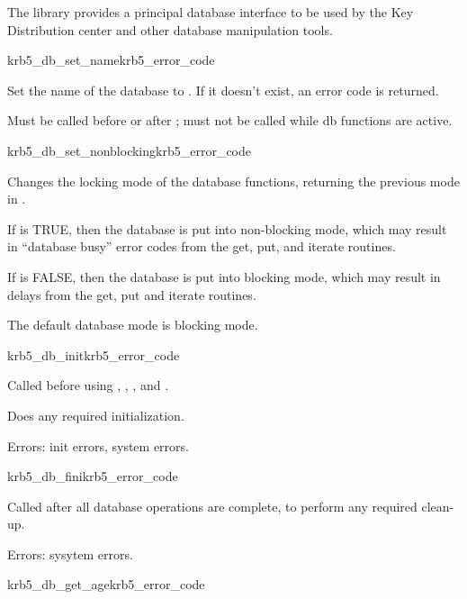 The  library provides a principal database interface
to be used by the Key Distribution center and other database
manipulation tools.


\begin{funcdecl}{krb5_db_set_name}{krb5_error_code}{\funcin}
\end{funcdecl}

Set the name of the database to .  If it doesn't exist,
an error code is returned.

Must be called before  or after
; must not be called while db functions are active.

\begin{funcdecl}{krb5_db_set_nonblocking}{krb5_error_code}{\funcin}
\funcout
{}
\end{funcdecl}

Changes the locking mode of the database functions, returning the previous
mode in .

If  is TRUE, then the database is put into
non-blocking mode, which may result in ``database busy'' error codes from
the get, put, and iterate routines.

If  is FALSE, then the database is put into blocking mode,
which may result in delays from the get, put and iterate routines.

The default database mode is blocking mode.

\begin{funcdecl}{krb5_db_init}{krb5_error_code}{\funcvoid}
\end{funcdecl}

Called before using ,
, , and
.

Does any required initialization.

Errors: init errors, system errors.

\begin{funcdecl}{krb5_db_fini}{krb5_error_code}{\funcvoid}
\end{funcdecl}

Called after all database operations are complete, to perform any required
clean-up.

Errors: sysytem errors.


\begin{funcdecl}{krb5_db_get_age}{krb5_error_code}{\funcin}
\funcout
{}
\end{funcdecl}

